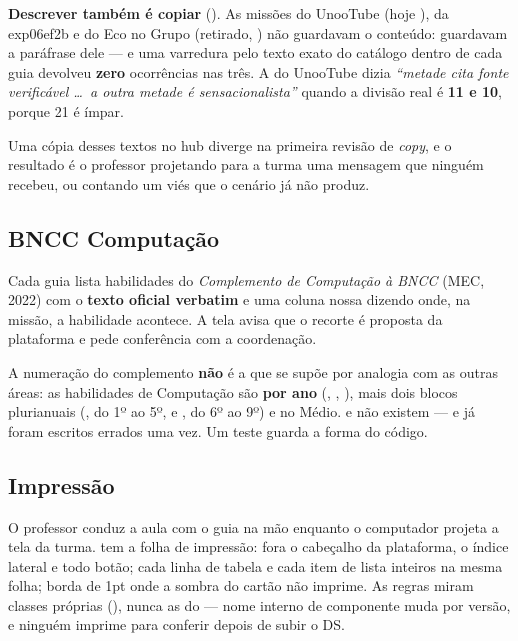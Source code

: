 \textbf{Descrever também é copiar} (). As missões do UnooTube (hoje
), da exp06ef2b e do Eco no Grupo (retirado,
) não guardavam o conteúdo:
guardavam a paráfrase dele --- e
uma varredura pelo texto exato do catálogo dentro de cada guia devolveu
\textbf{zero} ocorrências nas três. A do UnooTube dizia \emph{``metade cita
fonte verificável \dots\ a outra metade é sensacionalista''} quando a divisão
real é \textbf{11 e 10}, porque 21 é ímpar.

\begin{regra}
Uma cópia desses textos no hub diverge na primeira revisão de \emph{copy}, e o
resultado é o professor projetando para a turma uma mensagem que ninguém
recebeu, ou contando um viés que o cenário já não produz.
\end{regra}

\subsection{BNCC Computação}

Cada guia lista habilidades do \emph{Complemento de Computação à BNCC} (MEC,
2022) com o \textbf{texto oficial verbatim} e uma coluna nossa dizendo onde, na
missão, a habilidade acontece. A tela avisa que o recorte é proposta da
plataforma e pede conferência com a coordenação.

\begin{atencao}
A numeração do complemento \textbf{não} é a que se supõe por analogia com as
outras áreas: as habilidades de Computação são \textbf{por ano}
(, , ), mais dois blocos plurianuais
(, do 1º ao 5º, e , do 6º ao 9º) e  no
Médio.  e  não existem --- e já foram escritos errados
uma vez. Um teste guarda a forma do código.
\end{atencao}

\subsection{Impressão}

O professor conduz a aula com o guia na mão enquanto o computador projeta a tela
da turma.  tem a folha de impressão: fora o
cabeçalho da plataforma, o índice lateral e todo botão; cada linha de tabela e
cada item de lista inteiros na mesma folha; borda de 1pt onde a sombra do cartão
não imprime. As regras miram classes próprias (), nunca as do
 --- nome interno de componente muda por versão, e
ninguém imprime para conferir depois de subir o DS.

